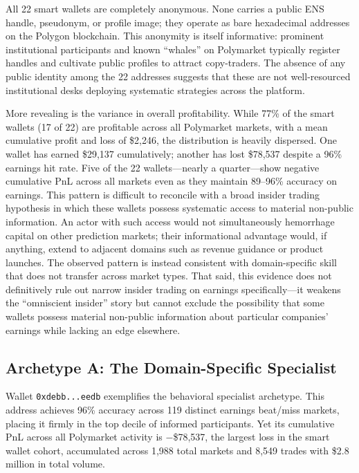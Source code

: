 \documentclass[11pt]{article}
\begin{document}
All 22 smart wallets are completely anonymous. None carries a public ENS handle, pseudonym, or profile image; they operate as bare hexadecimal addresses on the Polygon blockchain. This anonymity is itself informative: prominent institutional participants and known ``whales'' on Polymarket typically register handles and cultivate public profiles to attract copy-traders. The absence of any public identity among the 22 addresses suggests that these are not well-resourced institutional desks deploying systematic strategies across the platform.

More revealing is the variance in overall profitability. While 77\% of the smart wallets (17 of 22) are profitable across all Polymarket markets, with a mean cumulative profit and loss of \$2,246, the distribution is heavily dispersed. One wallet has earned \$29,137 cumulatively; another has lost \$78,537 despite a 96\% earnings hit rate. Five of the 22 wallets---nearly a quarter---show negative cumulative PnL across all markets even as they maintain 89--96\% accuracy on earnings. This pattern is difficult to reconcile with a broad insider trading hypothesis in which these wallets possess systematic access to material non-public information. An actor with such access would not simultaneously hemorrhage capital on other prediction markets; their informational advantage would, if anything, extend to adjacent domains such as revenue guidance or product launches. The observed pattern is instead consistent with domain-specific skill that does not transfer across market types. That said, this evidence does not definitively rule out narrow insider trading on earnings specifically---it weakens the ``omniscient insider'' story but cannot exclude the possibility that some wallets possess material non-public information about particular companies' earnings while lacking an edge elsewhere.

\subsection{Archetype A: The Domain-Specific Specialist}

Wallet \texttt{0xdebb...eedb} exemplifies the behavioral specialist archetype. This address achieves 96\% accuracy across 119 distinct earnings beat/miss markets, placing it firmly in the top decile of informed participants. Yet its cumulative PnL across all Polymarket activity is $-$\$78,537, the largest loss in the smart wallet cohort, accumulated across 1,988 total markets and 8,549 trades with \$2.8 million in total volume.
\end{document}

